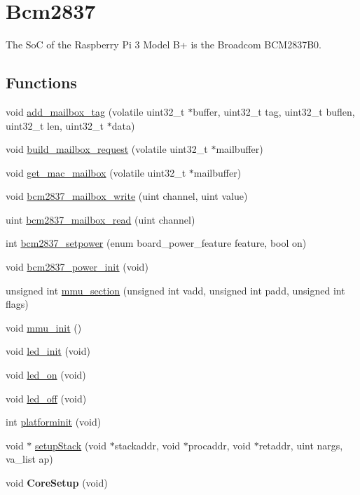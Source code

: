 \hypertarget{group__bcm2837}{\section{Bcm2837}
\label{group__bcm2837}
}


The So\-C of the Raspberry Pi 3 Model B+ is the Broadcom B\-C\-M2837\-B0.  


\subsection*{Functions}
\begin{DoxyCompactItemize}
\item 
void \hyperlink{group__bcm2837_ga556fc5ad8b59adb57df58404e85efe8f}{add\-\_\-mailbox\-\_\-tag} (volatile uint32\-\_\-t $\ast$buffer, uint32\-\_\-t tag, uint32\-\_\-t buflen, uint32\-\_\-t len, uint32\-\_\-t $\ast$data)
\item 
void \hyperlink{group__bcm2837_ga3bdf72a46b4f0bdae32864267c39c2d8}{build\-\_\-mailbox\-\_\-request} (volatile uint32\-\_\-t $\ast$mailbuffer)
\item 
void \hyperlink{group__bcm2837_ga2aa4bfcc808a4bb452a90c63426e2505}{get\-\_\-mac\-\_\-mailbox} (volatile uint32\-\_\-t $\ast$mailbuffer)
\item 
void \hyperlink{group__bcm2837_ga560d6c2a9ab56136a3219b1aceaca531}{bcm2837\-\_\-mailbox\-\_\-write} (uint channel, uint value)
\item 
uint \hyperlink{group__bcm2837_gaf3a135e92d25f12cae0cc9c4e380c2e0}{bcm2837\-\_\-mailbox\-\_\-read} (uint channel)
\item 
int \hyperlink{group__bcm2837_gad5db106cf15f544accbdeb02ed89894a}{bcm2837\-\_\-setpower} (enum board\-\_\-power\-\_\-feature feature, bool on)
\item 
void \hyperlink{group__bcm2837_gad1cb830ad707715e909b54abc6f8d9d5}{bcm2837\-\_\-power\-\_\-init} (void)
\item 
unsigned int \hyperlink{group__bcm2837_gaba27187e9e8c347b2f7e2f3d1eeafe83}{mmu\-\_\-section} (unsigned int vadd, unsigned int padd, unsigned int flags)
\item 
void \hyperlink{group__bcm2837_gabd7eba8cae99b9fb84685567d7f35242}{mmu\-\_\-init} ()
\item 
void \hyperlink{group__bcm2837_ga7eb4d382bdd4b42c57dbb7154d03ac66}{led\-\_\-init} (void)
\item 
void \hyperlink{group__bcm2837_ga801936b261245054eb570e040642818a}{led\-\_\-on} (void)
\item 
void \hyperlink{group__bcm2837_ga429f05b7eac928971c19e37ddc7079be}{led\-\_\-off} (void)
\item 
int \hyperlink{group__bcm2837_gab8f68c443b71713640467ae1be1228f1}{platforminit} (void)
\item 
void $\ast$ \hyperlink{group__bcm2837_gabd29847cfed983d7133858e65fc2d146}{setup\-Stack} (void $\ast$stackaddr, void $\ast$procaddr, void $\ast$retaddr, uint nargs, va\-\_\-list ap)
\item 
\hypertarget{group__bcm2837_gaba2a41b7c6a7714a97247c273185b45a}{void {\bfseries Core\-Setup} (void)}\label{group__bcm2837_gaba2a41b7c6a7714a97247c273185b45a}


\end{DoxyCompactItemize}
